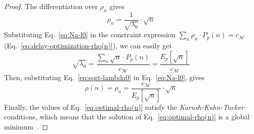 \documentclass[journal]{IEEEtran}
\newcommand{\eq}[1]{Eq.~\eqref{#1}}
\begin{document}
\begin{proof}
The differentiation over $\rho_{n}$ gives
\begin{equation}\label{eq:Na-l0}
 \rho_{n} = \frac{1}{\sqrt{\lambda_{0}}}\cdot\sqrt{n}
\end{equation}
Substituting \eq{eq:Na-l0} in the constraint expression $\sum_{n} \rho_{n}\cdot P_{p}(n)= c_{\mathcal{M}}$ (\eq{eq:delay-optimization-rho(n)}), we can easily get
\begin{equation}\label{eq:sqrt-lambda0}
 \sqrt{\lambda_{0}} = \frac{\sum_{n} \sqrt{n}\cdot P_{p}(n)}{c_{\mathcal{M}}} = \frac{E_{p}[\sqrt{n}]}{c_{\mathcal{M}}}
\end{equation}
Then, substituting \eq{eq:sqrt-lambda0} in \eq{eq:Na-l0}, gives
\begin{equation}\label{eq:optimal-rho(n)}
\rho(n) = \rho_{n} =  \frac{c_{\mathcal{M}}}{E_{p}[\sqrt{n}]} \cdot\sqrt{n}
\end{equation}
Finally, the values of \eq{eq:optimal-rho(n)} satisfy the \textit{Karush-Kuhn-Tucker} conditions, which means that the solution of \eq{eq:optimal-rho(n)} is a global minimum~\cite{practical-optimization-book}.
\end{proof}
\end{document}
